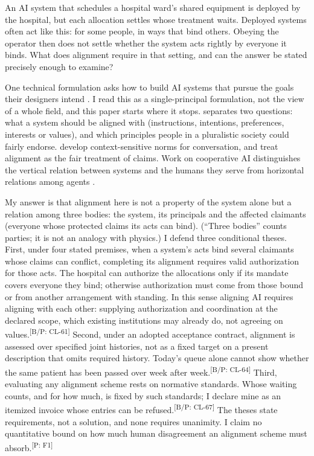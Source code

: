 \documentclass[pdflatex,sn-basic]{sn-jnl}%
\newcommand{\slot}[1]{}%
\newcommand{\claim}[2]{\ifannotated\textsuperscript{\textcolor{blue!60!black}{\tiny[#1: #2]}}\fi}
\newcommand{\enquote}[1]{``#1''}
\begin{document}
\slot{1.1}
An AI system that schedules a hospital ward's shared equipment is deployed by the hospital, but each allocation settles whose treatment waits. Deployed systems often act like this: for some people, in ways that bind others. Obeying the operator then does not settle whether the system acts rightly by everyone it binds. What does alignment require in that setting, and can the answer be stated precisely enough to examine?

One technical formulation asks how to build AI systems that pursue the goals their designers intend \citep{dung2023}. I read this as a single-principal formulation, not the view of a whole field, and this paper starts where it stops. \citet{gabriel2020} separates two questions: what a system should be aligned with (instructions, intentions, preferences, interests or values), and which principles people in a pluralistic society could fairly endorse. \citet{kasirzadeh2023} develop context-sensitive norms for conversation, and \citet{gabriel2025keeling} treat alignment as the fair treatment of claims. Work on cooperative AI distinguishes the vertical relation between systems and the humans they serve from horizontal relations among agents \citep{dafoe2020}.

\slot{1.2}
My answer is that alignment here is not a property of the system alone but a relation among three bodies: the system, its principals and the affected claimants (everyone whose protected claims its acts can bind). (\enquote{Three bodies} counts parties; it is not an analogy with physics.) I defend three conditional theses. First, under four stated premises, when a system's acts bind several claimants whose claims can conflict, completing its alignment requires valid authorization for those acts. The hospital can authorize the allocations only if its mandate covers everyone they bind; otherwise authorization must come from those bound or from another arrangement with standing. In this sense aligning AI requires aligning with each other: supplying authorization and coordination at the declared scope, which existing institutions may already do, not agreeing on values.\claim{B/P}{CL-61} Second, under an adopted acceptance contract, alignment is assessed over specified joint histories, not as a fixed target on a present description that omits required history. Today's queue alone cannot show whether the same patient has been passed over week after week.\claim{B/P}{CL-64} Third, evaluating any alignment scheme rests on normative standards. Whose waiting counts, and for how much, is fixed by such standards; I declare mine as an itemized invoice whose entries can be refused.\claim{B/P}{CL-67} The theses state requirements, not a solution, and none requires unanimity. I claim no quantitative bound on how much human disagreement an alignment scheme must absorb.\claim{P}{F1}
\end{document}
